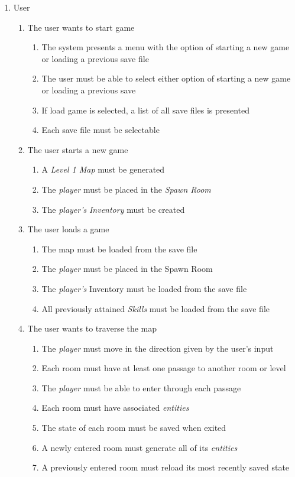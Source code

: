 \documentclass[12pt, titlepage]{article}
\begin{document}
\begin{enumerate}[{VP}1.]
  \item User 

  \begin{enumerate}[{BE1}.1]

    \item The user wants to start game
    \begin{enumerate}
      \item The system presents a menu with the option of starting a new game or loading a previous save file
      \item The user must be able to select either option of starting a new game or loading a previous save
      \item If load game is selected, a list of all save files is presented
      \item Each save file must be selectable
    \end{enumerate}

    \item The user starts a new game
    \begin{enumerate}
      \item A \textit{Level 1 Map} must be generated
      \item The \textit{player} must be placed in the \textit{Spawn Room}
      \item The \textit{player's} \textit{Inventory} must be created
    \end{enumerate}

    \item The user loads a game
    \begin{enumerate}
      \item The map must be loaded from the save file
      \item The \textit{player} must be placed in the Spawn Room
      \item The \textit{player's} Inventory must be loaded from the save file
      \item All previously attained \textit{Skills} must be loaded from the save file
    \end{enumerate}

    \item The user wants to traverse the map
    \begin{enumerate}
      \item The \textit{player} must move in the direction given by the user's input
      \item Each room must have at least one passage to another room or level
      \item The \textit{player} must be able to enter through each passage
      \item Each room must have associated \textit{entities}
      \item The state of each room must be saved when exited
      \item A newly entered room must generate all of its \textit{entities}
      \item A previously entered room must reload its most recently saved state
    \end{enumerate}


\end{enumerate}
\end{enumerate}
\end{document}
